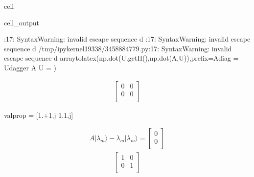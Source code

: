 \documentclass[letterpaper,10pt,english]{jupyterBook}
\begin{document}
\begin{sphinxuseclass}{cell}
\begin{sphinxVerbatimOutput}
\begin{sphinxuseclass}{cell_output}
\begin{sphinxVerbatim}[commandchars=\\\{\}]
\PYGZlt{}\PYGZgt{}:17: SyntaxWarning: invalid escape sequence \PYGZsq{}\PYGZbs{}d\PYGZsq{}
\PYGZlt{}\PYGZgt{}:17: SyntaxWarning: invalid escape sequence \PYGZsq{}\PYGZbs{}d\PYGZsq{}
/tmp/ipykernel\PYGZus{}19338/3458884779.py:17: SyntaxWarning: invalid escape sequence \PYGZsq{}\PYGZbs{}d\PYGZsq{}
  array\PYGZus{}to\PYGZus{}latex(np.dot(U.getH(),np.dot(A,U)),prefix=\PYGZsq{}A\PYGZus{}\PYGZob{}diag\PYGZcb{} = U\PYGZca{}\PYGZob{}\PYGZbs{}dagger\PYGZcb{} A U = \PYGZsq{})
\end{sphinxVerbatim}
\begin{equation*}
\begin{split}\begin{bmatrix}
0 & 0  \\
 0 & 0  \\
 \end{bmatrix}
\end{split}
\end{equation*}
\begin{sphinxVerbatim}[commandchars=\\\{\}]
valprop = [1.+1.j 1.\PYGZhy{}1.j]
\end{sphinxVerbatim}
\begin{equation*}
\begin{split}
A|\lambda_m \rangle -\lambda_m |\lambda_m\rangle =  
\begin{bmatrix}
0  \\
 0  \\
 \end{bmatrix}
\end{split}
\end{equation*}\begin{equation*}
\begin{split}\begin{bmatrix}
1 & 0  \\
 0 & 1  \\
 \end{bmatrix}
\end{split}
\end{equation*}
\end{sphinxuseclass}\end{sphinxVerbatimOutput}

\end{sphinxuseclass}
\sphinxAtStartPar
\end{document}
